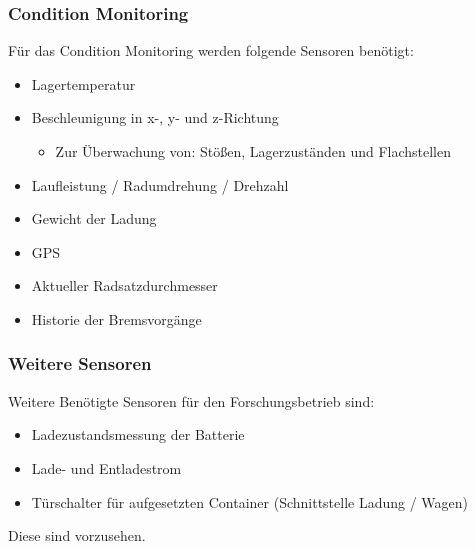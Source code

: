 \subsubsection{Condition Monitoring}
\begin{feat}
Für das Condition Monitoring werden folgende Sensoren benötigt:
\begin{itemize}
    \item Lagertemperatur
    \item Beschleunigung in x-, y- und z-Richtung
    \begin{itemize}
        \item Zur Überwachung von: Stößen, Lagerzuständen und Flachstellen
    \end{itemize}
    \item Laufleistung / Radumdrehung / Drehzahl
    \item Gewicht der Ladung
    \item GPS
    \item Aktueller Radsatzdurchmesser
    \item Historie der Bremsvorgänge
\end{itemize}
\end{feat}

\subsubsection{Weitere Sensoren}
\begin{feat}
Weitere Benötigte Sensoren für den Forschungsbetrieb sind:
\begin{itemize}
    \item Ladezustandsmessung der Batterie
    \item Lade- und Entladestrom
    \item Türschalter für aufgesetzten Container (Schnittstelle Ladung / Wagen)
\end{itemize}
Diese sind vorzusehen.
\end{feat}

